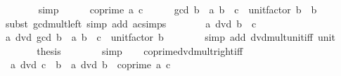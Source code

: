 \begin{isabellebody}
\ \ \ \ \ \ \isamarkupfalse%
\ simp\isanewline
\ \ \ \ \isamarkupfalse%
\ {\isacartoucheopen}coprime\ a\ c{\isacartoucheclose}\isanewline
\ \ \ \ \isamarkupfalse%
\ {\isachardoublequoteopen}gcd\ {\isacharparenleft}{\kern0pt}b\ {\isacharasterisk}{\kern0pt}\ a{\isacharparenright}{\kern0pt}\ {\isacharparenleft}{\kern0pt}b\ {\isacharasterisk}{\kern0pt}\ c{\isacharparenright}{\kern0pt}\ {\isacharasterisk}{\kern0pt}\ unit{\isacharunderscore}{\kern0pt}factor\ b\ {\isacharequal}{\kern0pt}\ b{\isachardoublequoteclose}\isanewline
\ \ \ \ \ \ \isamarkupfalse%
\ {\isacharparenleft}{\kern0pt}subst\ gcd{\isacharunderscore}{\kern0pt}mult{\isacharunderscore}{\kern0pt}left{\isacharparenright}{\kern0pt}\ {\isacharparenleft}{\kern0pt}simp\ add{\isacharcolon}{\kern0pt}\ ac{\isacharunderscore}{\kern0pt}simps{\isacharparenright}{\kern0pt}\isanewline
\ \ \ \ \isamarkupfalse%
\ \isamarkupfalse%
\ {\isacartoucheopen}a\ dvd\ b\ {\isacharasterisk}{\kern0pt}\ c{\isacartoucheclose}\isanewline
\ \ \ \ \isamarkupfalse%
\ {\isachardoublequoteopen}a\ dvd\ gcd\ {\isacharparenleft}{\kern0pt}b\ {\isacharasterisk}{\kern0pt}\ a{\isacharparenright}{\kern0pt}\ {\isacharparenleft}{\kern0pt}b\ {\isacharasterisk}{\kern0pt}\ c{\isacharparenright}{\kern0pt}\ {\isacharasterisk}{\kern0pt}\ unit{\isacharunderscore}{\kern0pt}factor\ b{\isachardoublequoteclose}\isanewline
\ \ \ \ \ \ \isamarkupfalse%
\ {\isacharparenleft}{\kern0pt}simp\ add{\isacharcolon}{\kern0pt}\ dvd{\isacharunderscore}{\kern0pt}mult{\isacharunderscore}{\kern0pt}unit{\isacharunderscore}{\kern0pt}iff\ unit{\isacharparenright}{\kern0pt}\isanewline
\ \ \ \ \isamarkupfalse%
\ \isamarkupfalse%
\ {\isacharquery}{\kern0pt}thesis\isanewline
\ \ \ \ \ \ \isamarkupfalse%
\ simp\isanewline
\ \ \isamarkupfalse%
\isanewline
{}\isamarkupfalse%
%
\endisatagproof
{\isafoldproof}%
%
\isadelimproof
\isanewline
%
\endisadelimproof
\isanewline
{}\isamarkupfalse%
\ coprime{\isacharunderscore}{\kern0pt}dvd{\isacharunderscore}{\kern0pt}mult{\isacharunderscore}{\kern0pt}right{\isacharunderscore}{\kern0pt}iff{\isacharcolon}{\kern0pt}\isanewline
\ \ {\isachardoublequoteopen}a\ dvd\ c\ {\isacharasterisk}{\kern0pt}\ b\ {\isasymlongleftrightarrow}\ a\ dvd\ b{\isachardoublequoteclose}\ \ {\isachardoublequoteopen}coprime\ a\ c{\isachardoublequoteclose}\isanewline
%
\isadelimproof
\ \ %
\endisadelimproof
%
\isatagproof

\end{isabellebody}
